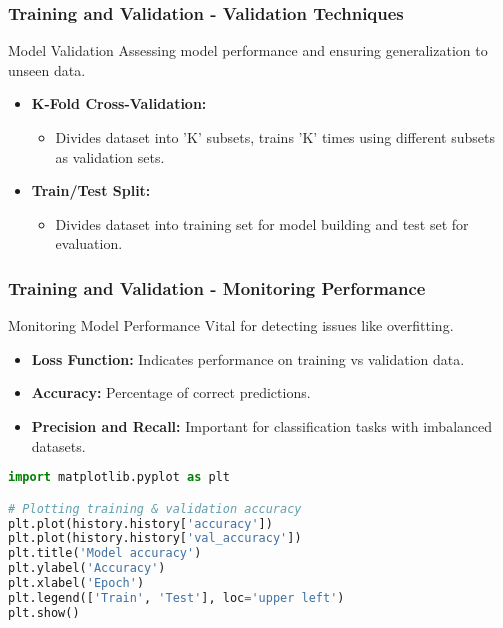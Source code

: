 \documentclass[aspectratio=169]{beamer}
\begin{document}
\begin{frame}[fragile]
    \frametitle{Training and Validation - Validation Techniques}
    \begin{block}{Model Validation}
        Assessing model performance and ensuring generalization to unseen data.
    \end{block}
    
    \begin{itemize}
        \item \textbf{K-Fold Cross-Validation:}
        \begin{itemize}
            \item Divides dataset into 'K' subsets, trains 'K' times using different subsets as validation sets.
        \end{itemize}
        
        \item \textbf{Train/Test Split:}
        \begin{itemize}
            \item Divides dataset into training set for model building and test set for evaluation.
        \end{itemize}
    \end{itemize}
\end{frame}

\begin{frame}[fragile]
    \frametitle{Training and Validation - Monitoring Performance}
    \begin{block}{Monitoring Model Performance}
        Vital for detecting issues like overfitting.
    \end{block}
    
    \begin{itemize}
        \item \textbf{Loss Function:} Indicates performance on training vs validation data.
        \item \textbf{Accuracy:} Percentage of correct predictions.
        \item \textbf{Precision and Recall:} Important for classification tasks with imbalanced datasets.
    \end{itemize}
    
    \begin{lstlisting}[language=Python]
import matplotlib.pyplot as plt

# Plotting training & validation accuracy
plt.plot(history.history['accuracy'])
plt.plot(history.history['val_accuracy'])
plt.title('Model accuracy')
plt.ylabel('Accuracy')
plt.xlabel('Epoch')
plt.legend(['Train', 'Test'], loc='upper left')
plt.show()
    \end{lstlisting}
\end{frame}
\end{document}

